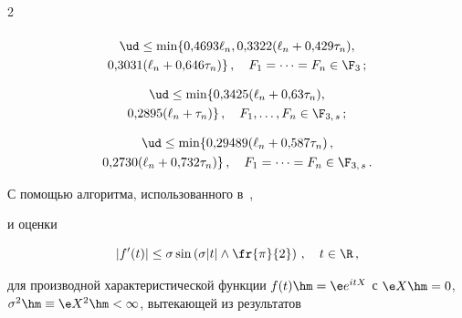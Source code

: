 \begin{multicols}{2}
\begin{multline*}
\end{multline*}





\noindent

\begin{multline*}

\ud\le \min\{ 0{,}4693\ell_n, 0{,}3322(\ell_n+0{,}429\tau_n),\\

0{,}3031(\ell_n+0{,}646\tau_n)\}\,,\quad  F_1=\cdots=F_n\in\F_3\,;

\end{multline*}



\vspace*{-9pt}



\noindent

\begin{multline*}

\ud\le \min\{ 0{,}3425(\ell_n+0{,}63\tau_n),\\

0{,}2895(\ell_n+\tau_n) \}\,,\quad  F_1,\ldots,F_n\in\F_{3,\,s}\,;

\end{multline*}



\vspace*{-9pt}



\noindent

\begin{multline*}

\ud\le \min\{ 0{,}29489(\ell_n+0{,}587\tau_n)\,,\\

0{,}2730(\ell_n+0{,}732\tau_n)\}\,, \quad F_1=\cdots=F_n\in\F_{3,\,s}\,.

\end{multline*}



С помощью алгоритма, использованного в~\cite{Shevtsova2012ISSPSM3},

и оценки

$$

|f'(t)|\le \sigma\sin\left(\sigma|t| \wedge\fr{\pi}{2}\right)\,,\quad t\in\R\,,

$$

для производной характеристической функции $f(t)\hm=\e e^{itX}$ с $\e

X\hm=0$, $\sigma^2\hm\equiv\e X^2\hm<\infty$, вытекающей из результатов


\end{multicols}
